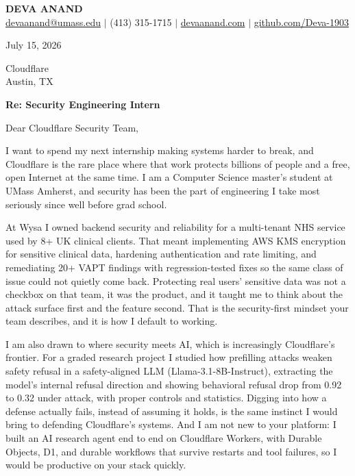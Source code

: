 \documentclass[letterpaper,11pt]{article}
\begin{document}
\begin{center}
    {\fontsize{18}{20}\selectfont\bfseries DEVA ANAND}\\ \vspace{3pt}
    {\small
    \href{mailto:devaanand@umass.edu}{devaanand@umass.edu}
    \enspace$\vert$\enspace
    (413) 315-1715
    \enspace$\vert$\enspace
    \href{https://devaanand.com}{devaanand.com}
    \enspace$\vert$\enspace
    \href{https://github.com/Deva-1903}{github.com/Deva-1903}}
\end{center}
\vspace{6pt}

\noindent July 15, 2026

\vspace{2pt}

\noindent Cloudflare\\
Austin, TX

\vspace{2pt}

\noindent \textbf{Re: Security Engineering Intern}

\vspace{4pt}

\noindent Dear Cloudflare Security Team,

I want to spend my next internship making systems harder to break, and Cloudflare is the rare place where that work protects billions of people and a free, open Internet at the same time. I am a Computer Science master's student at UMass Amherst, and security has been the part of engineering I take most seriously since well before grad school.

At Wysa I owned backend security and reliability for a multi-tenant NHS service used by 8+ UK clinical clients. That meant implementing AWS KMS encryption for sensitive clinical data, hardening authentication and rate limiting, and remediating 20+ VAPT findings with regression-tested fixes so the same class of issue could not quietly come back. Protecting real users' sensitive data was not a checkbox on that team, it was the product, and it taught me to think about the attack surface first and the feature second. That is the security-first mindset your team describes, and it is how I default to working.

I am also drawn to where security meets AI, which is increasingly Cloudflare's frontier. For a graded research project I studied how prefilling attacks weaken safety refusal in a safety-aligned LLM (Llama-3.1-8B-Instruct), extracting the model's internal refusal direction and showing behavioral refusal drop from 0.92 to 0.32 under attack, with proper controls and statistics. Digging into how a defense actually fails, instead of assuming it holds, is the same instinct I would bring to defending Cloudflare's systems. And I am not new to your platform: I built an AI research agent end to end on Cloudflare Workers, with Durable Objects, D1, and durable workflows that survive restarts and tool failures, so I would be productive on your stack quickly.
\end{document}
